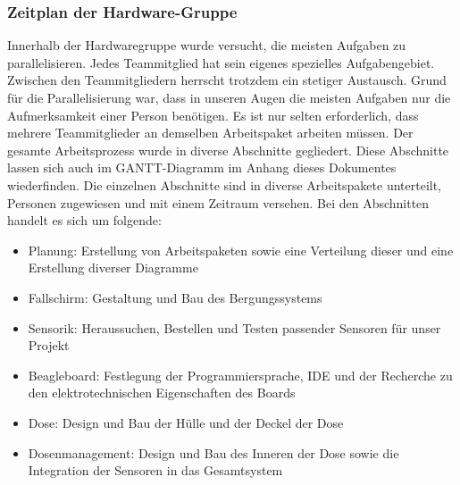 \subsubsection{Zeitplan der Hardware-Gruppe}
Innerhalb der Hardwaregruppe wurde versucht, die meisten Aufgaben zu parallelisieren. Jedes Teammitglied hat sein eigenes spezielles Aufgabengebiet. Zwischen den Teammitgliedern herrscht trotzdem ein stetiger Austausch. Grund für die Parallelisierung war, dass in unseren Augen die meisten Aufgaben  nur die Aufmerksamkeit einer Person benötigen. Es ist nur selten erforderlich, dass mehrere Teammitglieder an demselben Arbeitspaket arbeiten müssen. Der gesamte Arbeitsprozess wurde in diverse Abschnitte gegliedert. Diese Abschnitte lassen sich auch im GANTT-Diagramm im Anhang dieses Dokumentes wiederfinden. Die einzelnen Abschnitte sind in diverse Arbeitspakete unterteilt, Personen zugewiesen und mit einem Zeitraum versehen. Bei den Abschnitten handelt es sich um folgende:
\begin{itemize}
\item Planung: Erstellung von Arbeitspaketen sowie eine Verteilung dieser und eine Erstellung diverser Diagramme
\item Fallschirm: Gestaltung und Bau des Bergungssystems
\item Sensorik: Heraussuchen, Bestellen und Testen passender Sensoren für unser Projekt
\item Beagleboard: Festlegung der Programmiersprache, IDE und der Recherche zu den elektrotechnischen Eigenschaften des Boards
\item Dose: Design und Bau der Hülle und der Deckel der Dose
\item Dosenmanagement: Design und Bau des Inneren der Dose sowie die Integration der Sensoren in das Gesamtsystem
\end{itemize}

